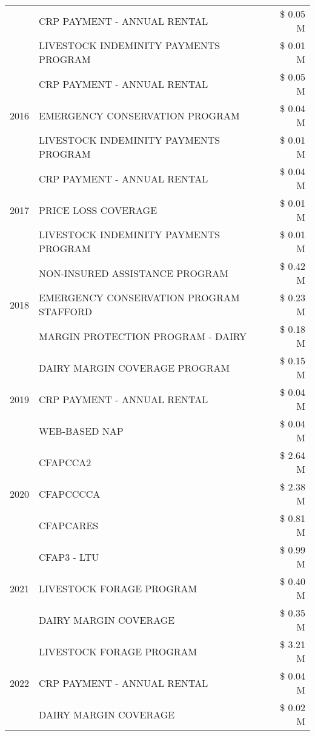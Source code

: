 \begin{tabular}{llr}
 & CRP PAYMENT - ANNUAL RENTAL & \$ 0.05 M \\
 & LIVESTOCK INDEMINITY PAYMENTS PROGRAM & \$ 0.01 M \\
\cline{1-3}
\multirow[t]{3}{*}{2016} & CRP PAYMENT - ANNUAL RENTAL & \$ 0.05 M \\
 & EMERGENCY CONSERVATION PROGRAM & \$ 0.04 M \\
 & LIVESTOCK INDEMINITY PAYMENTS PROGRAM & \$ 0.01 M \\
\cline{1-3}
\multirow[t]{3}{*}{2017} & CRP PAYMENT - ANNUAL RENTAL & \$ 0.04 M \\
 & PRICE LOSS COVERAGE & \$ 0.01 M \\
 & LIVESTOCK INDEMINITY PAYMENTS PROGRAM & \$ 0.01 M \\
\cline{1-3}
\multirow[t]{3}{*}{2018} & NON-INSURED ASSISTANCE PROGRAM & \$ 0.42 M \\
 & EMERGENCY CONSERVATION PROGRAM STAFFORD & \$ 0.23 M \\
 & MARGIN PROTECTION PROGRAM - DAIRY & \$ 0.18 M \\
\cline{1-3}
\multirow[t]{3}{*}{2019} & DAIRY MARGIN COVERAGE PROGRAM & \$ 0.15 M \\
 & CRP PAYMENT - ANNUAL RENTAL & \$ 0.04 M \\
 & WEB-BASED NAP & \$ 0.04 M \\
\cline{1-3}
\multirow[t]{3}{*}{2020} & CFAPCCA2 & \$ 2.64 M \\
 & CFAPCCCCA & \$ 2.38 M \\
 & CFAPCARES & \$ 0.81 M \\
\cline{1-3}
\multirow[t]{3}{*}{2021} & CFAP3 - LTU & \$ 0.99 M \\
 & LIVESTOCK FORAGE PROGRAM & \$ 0.40 M \\
 & DAIRY MARGIN COVERAGE & \$ 0.35 M \\
\cline{1-3}
\multirow[t]{3}{*}{2022} & LIVESTOCK FORAGE PROGRAM & \$ 3.21 M \\
 & CRP PAYMENT - ANNUAL RENTAL & \$ 0.04 M \\
 & DAIRY MARGIN COVERAGE & \$ 0.02 M \\
\cline{1-3}
\bottomrule
\end{tabular}
